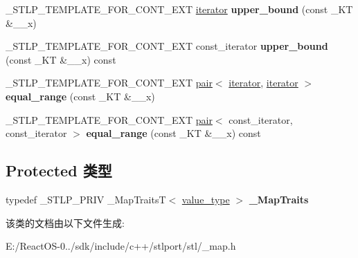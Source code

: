 \begin{DoxyCompactItemize}
\+\_\+\+S\+T\+L\+P\+\_\+\+T\+E\+M\+P\+L\+A\+T\+E\+\_\+\+F\+O\+R\+\_\+\+C\+O\+N\+T\+\_\+\+E\+XT \hyperlink{structiterator}{iterator} {\bfseries upper\+\_\+bound} (const \+\_\+\+KT \&\+\_\+\+\_\+x)
\item 
\mbox{\label{classmap_a3d44d9fbbecb54dec43fed591b879391}} 
\+\_\+\+S\+T\+L\+P\+\_\+\+T\+E\+M\+P\+L\+A\+T\+E\+\_\+\+F\+O\+R\+\_\+\+C\+O\+N\+T\+\_\+\+E\+XT const\+\_\+iterator {\bfseries upper\+\_\+bound} (const \+\_\+\+KT \&\+\_\+\+\_\+x) const
\item 
\mbox{\label{classmap_a67379ca940c7b4923e6ee48e118a21ae}} 
\+\_\+\+S\+T\+L\+P\+\_\+\+T\+E\+M\+P\+L\+A\+T\+E\+\_\+\+F\+O\+R\+\_\+\+C\+O\+N\+T\+\_\+\+E\+XT \hyperlink{structpair}{pair}$<$ \hyperlink{structiterator}{iterator}, \hyperlink{structiterator}{iterator} $>$ {\bfseries equal\+\_\+range} (const \+\_\+\+KT \&\+\_\+\+\_\+x)
\item 
\mbox{\label{classmap_a021b994d862701e35ee164cad82faf07}} 
\+\_\+\+S\+T\+L\+P\+\_\+\+T\+E\+M\+P\+L\+A\+T\+E\+\_\+\+F\+O\+R\+\_\+\+C\+O\+N\+T\+\_\+\+E\+XT \hyperlink{structpair}{pair}$<$ const\+\_\+iterator, const\+\_\+iterator $>$ {\bfseries equal\+\_\+range} (const \+\_\+\+KT \&\+\_\+\+\_\+x) const
\end{DoxyCompactItemize}
\subsection*{Protected 类型}
\begin{DoxyCompactItemize}
\item 
\mbox{\label{classmap_a1aa338beeacd77abf24d15d330aa77a5}} 
typedef \+\_\+\+S\+T\+L\+P\+\_\+\+P\+R\+IV \+\_\+\+Map\+TraitsT$<$ \hyperlink{structpair}{value\+\_\+type} $>$ {\bfseries \+\_\+\+Map\+Traits}
\end{DoxyCompactItemize}


该类的文档由以下文件生成\+:\begin{DoxyCompactItemize}
\item 
E\+:/\+React\+O\+S-\/0../sdk/include/c++/stlport/stl/\+\_\+map.\+h\end{DoxyCompactItemize}
